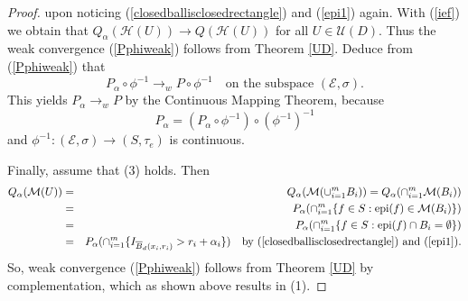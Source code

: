 \documentclass[sn-mathphys,Numbered]{sn-jnl}%
\theoremstyle{thmstyleone}%
\theoremstyle{thmstyletwo}%
\theoremstyle{thmstylethree}%
\begin{document}
\begin{proof}
upon noticing (\ref{closedballisclosedrectangle}) and (\ref{epi1}) again.
With (\ref{ief}) we obtain that $Q_\alpha(\mathcal{H}(U)) \rightarrow Q(\mathcal{H}(U))$ for all $U \in \mathcal{U}(D).$ Thus the weak convergence (\ref{Pphiweak}) follows from Theorem \ref{UD}. Deduce from (\ref{Pphiweak}) that
$$
 P_\alpha \circ \phi^{-1} \rightarrow_w P \circ \phi^{-1} \quad \text{on the subspace } (\mathcal{E},\sigma).
$$
This yields $P_\alpha \rightarrow_w P$ by the Continuous Mapping Theorem, because
$$P_\alpha=(P_\alpha \circ \phi^{-1})\circ (\phi^{-1})^{-1}$$
and $\phi^{-1}:(\mathcal{E},\sigma) \rightarrow (S,\tau_e)$
is continuous.

Finally, assume that (3) holds. Then
\begin{eqnarray*}
Q_\alpha(\mathcal{M}(U))&=& Q_\alpha(\mathcal{M}(\cup_{i=1}^m B_i))= Q_\alpha(\cap_{i=1}^m \mathcal{M}(B_i))\\
                        &=&P_\alpha(\cap_{i=1}^m \{f \in S: \text{epi}(f) \in \mathcal{M}(B_i)\})\\
                        &=&P_\alpha(\cap_{i=1}^m \{f \in S: \text{epi}(f) \cap B_i = \emptyset\})\\
                        &=&P_\alpha(\cap_{i=1}^m \{I_{\overline{B}_d(x_i,r_i)} > r_i+\alpha_i\}) \quad \text{by } (\ref{closedballisclosedrectangle}) \text{ and } (\ref{epi1}).
\end{eqnarray*}
So, weak convergence (\ref{Pphiweak}) follows from Theorem \ref{UD} by complementation, which as shown above results in (1).
\end{proof}
\end{document}
